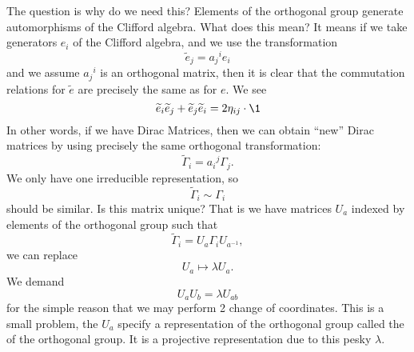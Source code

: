 The question is why do we need this? Elements of the orthogonal group
generate automorphisms of the Clifford algebra. What does this
mean? It means if we take generators $e_{i}$ of the Clifford
algebra, and we use the transformation
\begin{equation}
\widetilde{e}_{j} = {a_{j}}^{i}e_{i}
\end{equation}
and we assume ${a_{j}}^{i}$ is an orthogonal matrix, then it is
clear that the commutation relations for $\widetilde{e}$ are
precisely the same as for $e$. We see
\begin{equation}
\widetilde{e}_{i}\widetilde{e}_{j}+\widetilde{e}_{j}\widetilde{e}_{i}=2\eta_{ij}\cdot\1
\end{equation}
In other words, if we have Dirac Matrices, then we can obtain
``new'' Dirac matrices by using precisely the same orthogonal
transformation:
\begin{equation}
\widetilde{\Gamma}_{i} = {a_{i}}^{j}\Gamma_{j}.
\end{equation}
We only have one irreducible representation, so
\begin{equation}
\widetilde\Gamma_{i}\sim\Gamma_{i}
\end{equation}
should be similar. Is this matrix unique? That is we have
matrices $U_{a}$ indexed by elements of the orthogonal group such that
\begin{equation}
\widetilde\Gamma_{i}=U_{a}\Gamma_{i}U_{a^{-1}},
\end{equation}
we can replace
\begin{equation}
U_{a}\mapsto\lambda U_{a}.
\end{equation}
We demand
\begin{equation}
U_{a}U_{b}=\lambda U_{ab}
\end{equation}
for the simple reason that we may perform 2 change of
coordinates. This is a small problem, the $U_{a}$ specify a
representation of the orthogonal group called the  of the orthogonal group. It is a projective
representation due to this pesky $\lambda$.
